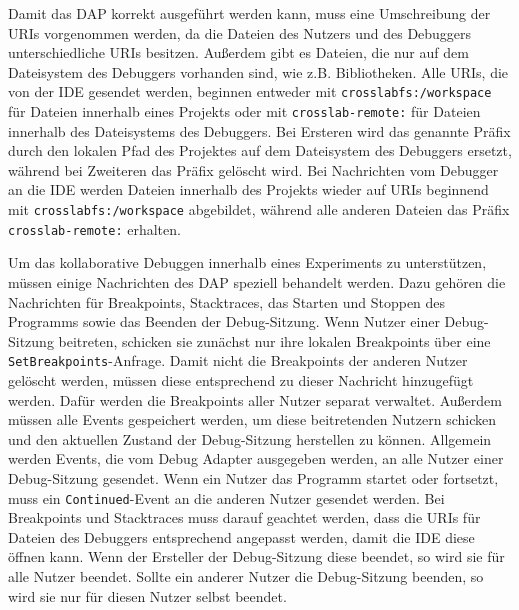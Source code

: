 Damit das \ac{DAP} korrekt ausgeführt werden kann, muss eine Umschreibung der URIs vorgenommen werden, da die Dateien des Nutzers und des Debuggers unterschiedliche URIs besitzen. Außerdem gibt es Dateien, die nur auf dem Dateisystem des Debuggers vorhanden sind, wie z.B. Bibliotheken. Alle URIs, die von der IDE gesendet werden, beginnen entweder mit \texttt{crosslabfs:/workspace} für Dateien innerhalb eines Projekts oder mit \texttt{crosslab-remote:} für Dateien innerhalb des Dateisystems des Debuggers. Bei Ersteren wird das genannte Präfix durch den lokalen Pfad des Projektes auf dem Dateisystem des Debuggers ersetzt, während bei Zweiteren das Präfix gelöscht wird. Bei Nachrichten vom Debugger an die IDE werden Dateien innerhalb des Projekts wieder auf URIs beginnend mit \texttt{crosslabfs:/workspace} abgebildet, während alle anderen Dateien das Präfix \texttt{crosslab-remote:} erhalten.

Um das kollaborative Debuggen innerhalb eines Experiments zu unterstützen, müssen einige Nachrichten des \ac{DAP} speziell behandelt werden. Dazu gehören die Nachrichten für Breakpoints, Stacktraces, das Starten und Stoppen des Programms sowie das Beenden der Debug-Sitzung. Wenn Nutzer einer Debug-Sitzung beitreten, schicken sie zunächst nur ihre lokalen Breakpoints über eine \texttt{SetBreakpoints}-Anfrage. Damit nicht die Breakpoints der anderen Nutzer gelöscht werden, müssen diese entsprechend zu dieser Nachricht hinzugefügt werden. Dafür werden die Breakpoints aller Nutzer separat verwaltet. Außerdem müssen alle Events gespeichert werden, um diese beitretenden Nutzern schicken und den aktuellen Zustand der Debug-Sitzung herstellen zu können. Allgemein werden Events, die vom Debug Adapter ausgegeben werden, an alle Nutzer einer Debug-Sitzung gesendet. Wenn ein Nutzer das Programm startet oder fortsetzt, muss ein \texttt{Continued}-Event an die anderen Nutzer gesendet werden. Bei Breakpoints und Stacktraces muss darauf geachtet werden, dass die URIs für Dateien des Debuggers entsprechend angepasst werden, damit die IDE diese öffnen kann. Wenn der Ersteller der Debug-Sitzung diese beendet, so wird sie für alle Nutzer beendet. Sollte ein anderer Nutzer die Debug-Sitzung beenden, so wird sie nur für diesen Nutzer selbst beendet.

